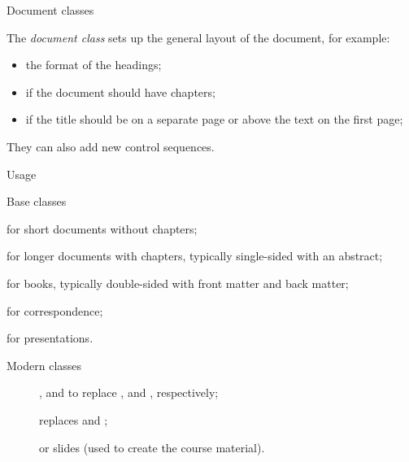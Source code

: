 
\begin{frame}{Document classes}

  The \emph{document class} sets up the general layout of the document,
  for example:
   \begin{itemize}
     \item the format of the headings;
     \item if the document should have chapters;
     \item if the title should be on a separate page or above 
       the text on the first page;
   \end{itemize}
   They can also add new control sequences.

  \begin{block}{Usage}
  \end{block}
\end{frame}

\begin{frame}{Base classes}

  \begin{description}
    \item[] for short documents without chapters;
    \item[] for longer documents with chapters,
      typically single-sided with an abstract;
    \item[] for books, typically double-sided with
      front matter and back matter;
    \item<2->[\cls{letter}] for correspondence;
    \item<2->[\cls{slides}] for presentations.
  \end{description}

\end{frame}

\begin{frame}{Modern classes}

  \begin{description}
    \item[] , 
      and  to replace , 
      and , respectively;
    \item[] replaces  and ;
    \item[] or slides (used to create the course 
      material).
  \end{description}
  
\end{frame}

